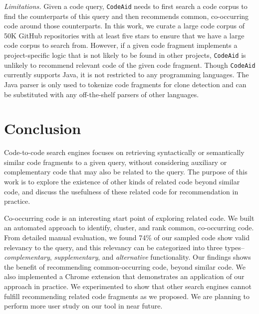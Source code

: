 \documentclass[conference]{IEEEtran}
\newcommand{\ttt}[1]{\tt\small{#1}}
\newcommand{\tool}{{\ttt CodeAid}}
\begin{document}
{\em Limitations.} Given a code query, {\tool} needs to first search a code corpus to find the counterparts of this query and then recommends common, co-occurring code around those counterparts. In this work, we curate a large code corpus of 50K GitHub repositories with at least five stars to ensure that we have a large code corpus to search from. However, if a given code fragment  implements a project-specific logic that is not likely to be found in other projects, {\tool} is unlikely to recommend relevant code of the given code fragment. Though {\tool} currently supports Java, it is not restricted to any programming languages. The Java parser is only used to tokenize code fragments for clone detection and can be substituted with any off-the-shelf parsers of other languages.


\section{Conclusion}
\label{sec:conclude}

Code-to-code search engines focuses on retrieving syntactically or semantically similar code fragments to a given query, without considering auxiliary or complementary code that may also be related to the query. The purpose of this work is to explore the existence of other kinds of related code beyond similar code, and discuss the usefulness of these related code for recommendation in practice.

Co-occurring code is an interesting start point of exploring related code. We built an automated approach to identify, cluster, and rank common, co-occurring code. From detailed manual evaluation, we found 74\% of our sampled code show valid relevancy to the query, and this relevancy can be categorized into three types--{\em complementary}, {\em supplementary}, and {\em alternative} functionality. Our findings shows the benefit of recommending common-occurring code, beyond similar code. We also implemented a Chrome extension that demonstrates an application of our approach in practice. We experimented to show that other search engines cannot fulfill recommending related code fragments as we proposed. We are planning to perform more user study on our tool in near future.
\end{document}

